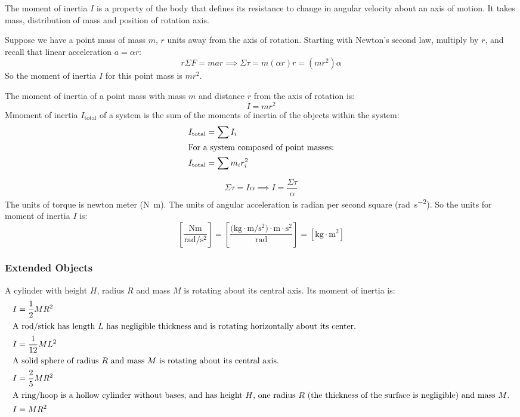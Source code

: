 \documentclass{article}
\newcommand{\theorem}[2]{\begin{tcolorbox}[title={#1},colback=blue!5!white,colframe=blue!75!black,parbox=false] #2 \end{tcolorbox}}
\begin{document}
The moment of inertia $I$ is a property of the body that defines its resistance to change in angular velocity about an axis of motion. It takes mass, distribution of mass and position of rotation axis.

Suppose we have a point mass of mass $m$, $r$ units away from the axis of rotation. Starting with Newton's second law, multiply by $r$, and recall that linear acceleration $a=\alpha r$:
\begin{equation*}
    r\Sigma F=mar
	\implies
	\Sigma \tau=m(\alpha r)r
	=\left( mr^2 \right)\alpha
\end{equation*}
So the moment of inertia $I$ for this point mass is $mr^2$.

\theorem*{
	The moment of inertia of a point mass with mass $m$ and distance $r$ from the axis of rotation is:
	\begin{equation*}
		I=mr^2
	\end{equation*}
	Mmoment of inertia $I_ \text{total}$ of a system is the sum of the moments of inertia of the objects within the system:
	\begin{align*}
		I_ \text{total}&=\sum I_i \\
		\intertext{For a system composed of point masses:}
		I_ \text{total}&=\sum m_ir_i^2
	\end{align*}
}

\begin{equation*}
    \Sigma \tau = I\alpha
	\implies I=\frac{\Sigma \tau}{\alpha}
\end{equation*}
The units of torque is newton meter (\si{\newton\meter}). The units of angular acceleration is radian per second square (\si{\radian\per\second^2}). So the units for moment of inertia $I$ is:
\begin{equation*}
	\left[\frac{\si{\newton\meter}}{\si{\radian\per\second^2}}\right]
	=\left[\frac{\si{(\kilo\gram\cdot\meter\per\second^2)\cdot\meter\cdot\second^2}}{\si{\radian}}\right]
	=\left[\si{\kilo\gram\cdot\meter^2}\right]
\end{equation*}

\subsubsection{Extended Objects}

A cylinder with height $H$, radius $R$ and mass $M$ is rotating about its central axis. Its moment of inertia is:
\begin{align*}
    I&=\frac12MR^2 \\
	\intertext{A rod/stick has length $L$ has negligible thickness and is rotating horizontally about its center.}
    I&=\frac{1}{12}ML^2 \\
	\intertext{A solid sphere of radius $R$ and mass $M$ is rotating about its central axis.}
    I&=\frac25MR^2 \\
	\intertext{A ring/hoop is a hollow cylinder without bases, and has height $H$, one radius $R$ (the thickness of the surface is negligible) and mass $M$.}
	I&=MR^2
\end{align*}
\end{document}

